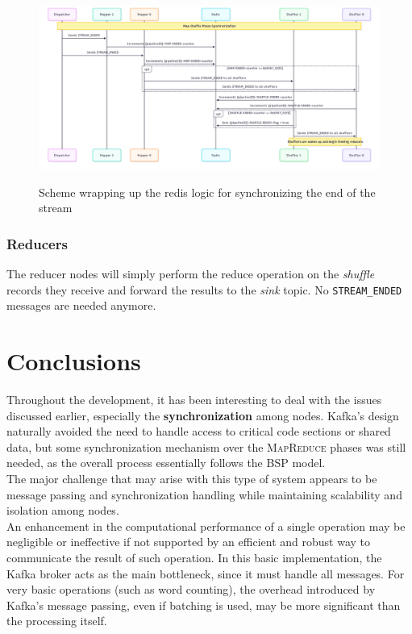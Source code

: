 \newpage
\begin{figure}[htbp]
   \centering
   \caption{Scheme wrapping up the redis logic for synchronizing the end of the stream}
   \includegraphics[width=\columnwidth]{images/redisSynch.png}
   \label{fig:redisSynch}
\end{figure}

\subsubsection{Reducers}
The reducer nodes will simply perform the reduce operation on the \textit{shuffle} records they receive and forward the results to the \textit{sink} topic.
No \verb|STREAM_ENDED| messages are needed anymore.


\section{Conclusions}

Throughout the development, it has been interesting to deal with the issues discussed earlier, especially the \textbf{synchronization} among nodes. Kafka's design naturally avoided the need to handle access to critical code sections or shared data, but some synchronization mechanism over the \textsc{MapReduce} phases was still needed, as the overall process essentially follows the \textsc{BSP} model.\\
The major challenge that may arise with this type of system appears to be message passing and synchronization handling while maintaining scalability and isolation among nodes.\\
An enhancement in the computational performance of a single operation may be negligible or ineffective if not supported by an efficient and robust way to communicate the result of such operation.
In this basic implementation, the Kafka broker acts as the main bottleneck, since it must handle all messages. For very basic operations (such as word counting), the overhead introduced by Kafka's message passing, even if batching is used, may be more significant than the processing itself.

